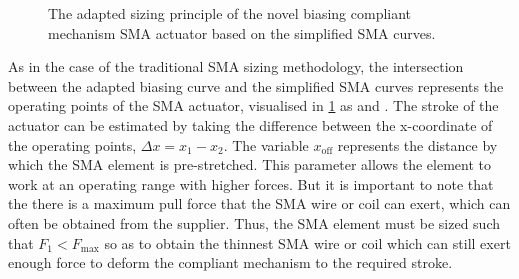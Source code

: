 \begin{figure}[ht] %
  \centering
  \caption{The adapted sizing principle of the novel biasing compliant mechanism SMA actuator based on the simplified SMA curves.}
  \label{fig:smaactwp-pt}
\end{figure}

As in the case of the traditional SMA sizing methodology, the intersection between the adapted biasing curve and the simplified SMA curves represents the operating points of the SMA actuator, visualised in \cref{fig:smaactwp-pt} as  and . The stroke of the actuator can be estimated by taking the difference between the x-coordinate of the operating points, $\Delta x = x_1-x_2$. The variable $x_\mathrm{off}$ represents the distance by which the SMA element is pre-stretched. This parameter allows the element to work at an operating range with higher forces. But it is important to note that the there is a maximum pull force that the SMA wire or coil can exert, which can often be obtained from the supplier. Thus, the SMA element must be sized such that $F_1 < F_\mathrm{max}$ so as to obtain the thinnest SMA wire or coil which can still exert enough force to deform the compliant mechanism to the required stroke.

